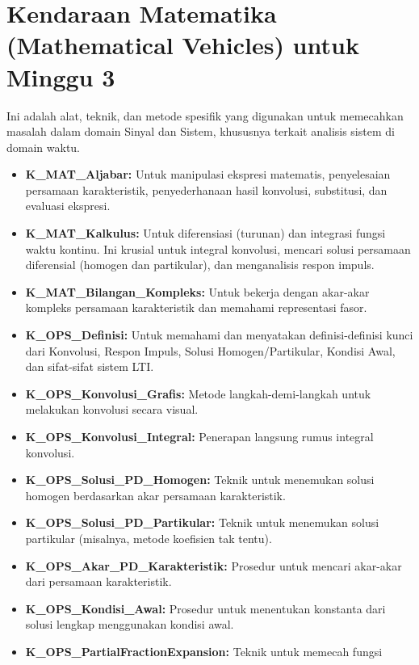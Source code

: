 \documentclass[
  letterpaper,
  DIV=11,
  numbers=noendperiod]{scrreprt}
\providecommand{\tightlist}{%
  \setlength{\itemsep}{0pt}\setlength{\parskip}{0pt}}
\begin{document}

\chapter{Kendaraan Matematika (Mathematical Vehicles) untuk Minggu
3}\label{kendaraan-matematika-mathematical-vehicles-untuk-minggu-3}

Ini adalah alat, teknik, dan metode spesifik yang digunakan untuk
memecahkan masalah dalam domain Sinyal dan Sistem, khususnya terkait
analisis sistem di domain waktu.

\begin{itemize}
\tightlist
\item
  \textbf{K\_MAT\_Aljabar:} Untuk manipulasi ekspresi matematis,
  penyelesaian persamaan karakteristik, penyederhanaan hasil konvolusi,
  substitusi, dan evaluasi ekspresi.
\item
  \textbf{K\_MAT\_Kalkulus:} Untuk diferensiasi (turunan) dan integrasi
  fungsi waktu kontinu. Ini krusial untuk integral konvolusi, mencari
  solusi persamaan diferensial (homogen dan partikular), dan
  menganalisis respon impuls.
\item
  \textbf{K\_MAT\_Bilangan\_Kompleks:} Untuk bekerja dengan akar-akar
  kompleks persamaan karakteristik dan memahami representasi fasor.
\item
  \textbf{K\_OPS\_Definisi:} Untuk memahami dan menyatakan
  definisi-definisi kunci dari Konvolusi, Respon Impuls, Solusi
  Homogen/Partikular, Kondisi Awal, dan sifat-sifat sistem LTI.
\item
  \textbf{K\_OPS\_Konvolusi\_Grafis:} Metode langkah-demi-langkah untuk
  melakukan konvolusi secara visual.
\item
  \textbf{K\_OPS\_Konvolusi\_Integral:} Penerapan langsung rumus
  integral konvolusi.
\item
  \textbf{K\_OPS\_Solusi\_PD\_Homogen:} Teknik untuk menemukan solusi
  homogen berdasarkan akar persamaan karakteristik.
\item
  \textbf{K\_OPS\_Solusi\_PD\_Partikular:} Teknik untuk menemukan solusi
  partikular (misalnya, metode koefisien tak tentu).
\item
  \textbf{K\_OPS\_Akar\_PD\_Karakteristik:} Prosedur untuk mencari
  akar-akar dari persamaan karakteristik.
\item
  \textbf{K\_OPS\_Kondisi\_Awal:} Prosedur untuk menentukan konstanta
  dari solusi lengkap menggunakan kondisi awal.
\item
  \textbf{K\_OPS\_PartialFractionExpansion:} Teknik untuk memecah fungsi

\end{itemize}
\end{document}
